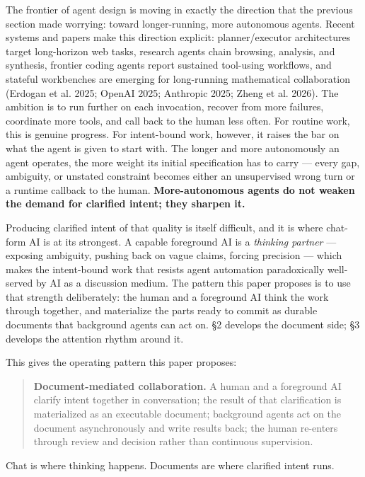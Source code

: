 \documentclass[
  nonatbib,
  preprint]{article}
\begin{document}
The frontier of agent design is moving in exactly the direction that the
previous section made worrying: toward longer-running, more autonomous
agents. Recent systems and papers make this direction explicit:
planner/executor architectures target long-horizon web tasks, research
agents chain browsing, analysis, and synthesis, frontier coding agents
report sustained tool-using workflows, and stateful workbenches are
emerging for long-running mathematical collaboration (Erdogan et al.
2025; OpenAI 2025; Anthropic 2025; Zheng et al. 2026). The ambition is
to run further on each invocation, recover from more failures,
coordinate more tools, and call back to the human less often. For
routine work, this is genuine progress. For intent-bound work, however,
it raises the bar on what the agent is given to start with. The longer
and more autonomously an agent operates, the more weight its initial
specification has to carry --- every gap, ambiguity, or unstated
constraint becomes either an unsupervised wrong turn or a runtime
callback to the human. \textbf{More-autonomous agents do not weaken the
demand for clarified intent; they sharpen it.}

Producing clarified intent of that quality is itself difficult, and it
is where chat-form AI is at its strongest. A capable foreground AI is a
\emph{thinking partner} --- exposing ambiguity, pushing back on vague
claims, forcing precision --- which makes the intent-bound work that
resists agent automation paradoxically well-served by AI as a discussion
medium. The pattern this paper proposes is to use that strength
deliberately: the human and a foreground AI think the work through
together, and materialize the parts ready to commit as durable documents
that background agents can act on. §2 develops the document side; §3
develops the attention rhythm around it.

This gives the operating pattern this paper proposes:

\begin{quote}
\textbf{Document-mediated collaboration.} A human and a foreground AI
clarify intent together in conversation; the result of that
clarification is materialized as an executable document; background
agents act on the document asynchronously and write results back; the
human re-enters through review and decision rather than continuous
supervision.
\end{quote}

Chat is where thinking happens. Documents are where clarified intent
runs.
\end{document}
